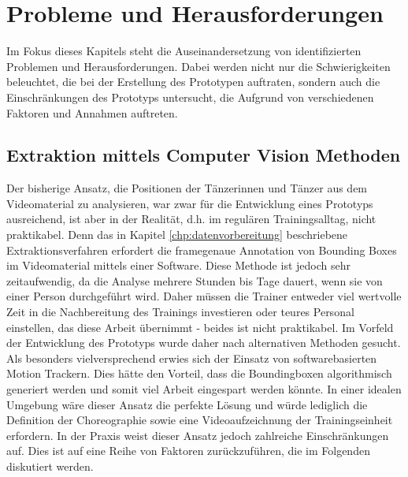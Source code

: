 \documentclass[
  ngerman,
  a4paper,  %
  twoside,  %
  bibliography=totoc,
  headsepline,
  cleardoublepage=empty,
  parskip=half,
  draft=false
]{scrbook}
\begin{document}
\chapter{Probleme und Herausforderungen \label{chp:probleme}}
Im Fokus dieses Kapitels steht die Auseinandersetzung von identifizierten Problemen und Herausforderungen. Dabei werden nicht nur die Schwierigkeiten beleuchtet, die bei der Erstellung des Prototypen auftraten, sondern auch die Einschränkungen des Prototyps untersucht, die Aufgrund von verschiedenen Faktoren und Annahmen auftreten.
\section{Extraktion mittels Computer Vision Methoden}

Der bisherige Ansatz, die Positionen der Tänzerinnen und Tänzer aus dem Videomaterial zu analysieren, war zwar für die Entwicklung eines Prototyps ausreichend, ist aber in der Realität, d.h. im regulären Trainingsalltag, nicht praktikabel. Denn das in Kapitel \ref{chp:datenvorbereitung} beschriebene Extraktionsverfahren erfordert die framegenaue Annotation von Bounding Boxes im Videomaterial mittels einer Software. Diese Methode ist jedoch sehr zeitaufwendig, da die Analyse mehrere Stunden bis Tage dauert, wenn sie von einer Person durchgeführt wird. Daher müssen die Trainer entweder viel wertvolle Zeit in die Nachbereitung des Trainings investieren oder teures Personal einstellen, das diese Arbeit übernimmt - beides ist nicht praktikabel.
Im Vorfeld der Entwicklung des Prototyps wurde daher nach alternativen Methoden gesucht. Als besonders vielversprechend erwies sich der Einsatz von softwarebasierten Motion Trackern. Dies hätte den Vorteil, dass die Boundingboxen algorithmisch generiert werden und somit viel Arbeit eingespart werden könnte. In einer idealen Umgebung wäre dieser Ansatz die perfekte Lösung und würde lediglich die Definition der Choreographie sowie eine Videoaufzeichnung der Trainingseinheit erfordern. In der Praxis weist dieser Ansatz jedoch zahlreiche Einschränkungen auf. Dies ist auf eine Reihe von Faktoren zurückzuführen, die im Folgenden diskutiert werden.
\end{document}
